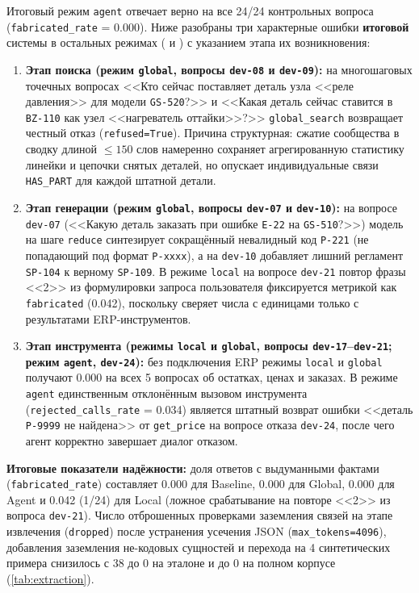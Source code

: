 \documentclass[a4paper,11pt]{article}
\begin{document}
Итоговый режим \texttt{agent} отвечает верно на все \num{24}/\num{24} контрольных вопроса (\texttt{fabricated\_rate} = \num{0.000}). Ниже разобраны три характерные ошибки \textbf{итоговой} системы в остальных режимах ( и ) с указанием этапа их возникновения:
\begin{enumerate}
  \item \textbf{Этап поиска (режим \texttt{global}, вопросы \texttt{dev-08} и \texttt{dev-09}):} на многошаговых точечных вопросах <<Кто сейчас поставляет деталь узла <<реле давления>> для модели \texttt{GS-520}?>> и <<Какая деталь сейчас ставится в \texttt{BZ-110} как узел <<нагреватель оттайки>>?>> \texttt{global\_search} возвращает честный отказ (\texttt{refused=True}). Причина структурная: сжатие сообщества в сводку длиной $\le 150$ слов намеренно сохраняет агрегированную статистику линейки и цепочки снятых деталей, но опускает индивидуальные связи \texttt{HAS\_PART} для каждой штатной детали.
  \item \textbf{Этап генерации (режим \texttt{global}, вопросы \texttt{dev-07} и \texttt{dev-10}):} на вопросе \texttt{dev-07} (<<Какую деталь заказать при ошибке \texttt{E-22} на \texttt{GS-510}?>>) модель на шаге \texttt{reduce} синтезирует сокращённый невалидный код \texttt{P-221} (не попадающий под формат \texttt{P-xxxx}), а на \texttt{dev-10} добавляет лишний регламент \texttt{SP-104} к верному \texttt{SP-109}. В режиме \texttt{local} на вопросе \texttt{dev-21} повтор фразы <<\SI{2}{}>> из формулировки запроса пользователя фиксируется метрикой как \texttt{fabricated} (\num{0.042}), поскольку  сверяет числа с единицами только с результатами ERP-инструментов.
  \item \textbf{Этап инструмента (режимы \texttt{local} и \texttt{global}, вопросы \texttt{dev-17}--\texttt{dev-21}; режим \texttt{agent}, \texttt{dev-24}):} без подключения ERP режимы \texttt{local} и \texttt{global} получают \num{0.000} на всех \num{5} вопросах об остатках, ценах и заказах. В режиме \texttt{agent} единственным отклонённым вызовом инструмента (\texttt{rejected\_calls\_rate} = \num{0.034}) является штатный возврат ошибки <<деталь \texttt{P-9999} не найдена>> от \texttt{get\_price} на вопросе отказа \texttt{dev-24}, после чего агент корректно завершает диалог отказом.
\end{enumerate}

\textbf{Итоговые показатели надёжности:} доля ответов с выдуманными фактами (\texttt{fabricated\_rate}) составляет \num{0.000} для Baseline, \num{0.000} для Global, \num{0.000} для Agent и \num{0.042} (\num{1}/\num{24}) для Local (ложное срабатывание на повторе <<\SI{2}{}>> из вопроса \texttt{dev-21}). Число отброшенных проверками заземления связей на этапе извлечения (\texttt{dropped}) после устранения усечения JSON (\texttt{max\_tokens=4096}), добавления заземления не-кодовых сущностей и перехода на \num{4} синтетических примера снизилось с \num{38} до \num{0} на эталоне и до \num{0} на полном корпусе (\cref{tab:extraction}).
\end{document}
